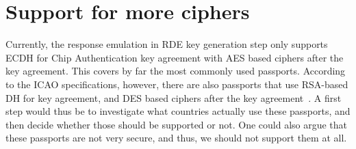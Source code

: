 \section{Support for more ciphers}
\label{sec:support-for-more-ciphers}
Currently, the response emulation in RDE key generation step only supports ECDH for Chip Authentication key agreement with AES based ciphers after the key agreement.
This covers by far the most commonly used passports.
According to the ICAO specifications, however, there are also passports that use RSA-based DH for key agreement, and DES based ciphers after the key agreement~\cite{icao9303securitymechanisms}.
A first step would thus be to investigate what countries actually use these passports, and then decide whether those should be supported or not.
One could also argue that these passports are not very secure, and thus, we should not support them at all.
